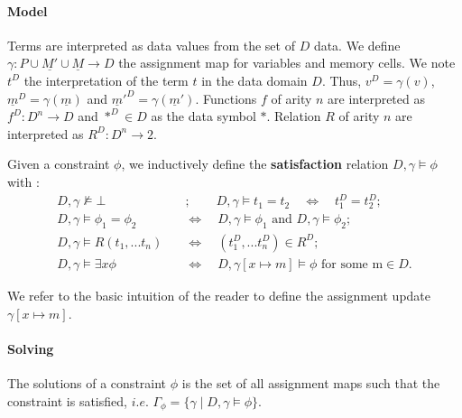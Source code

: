 \paragraph{Model} 
Terms are interpreted as data values from the set of $D$ data. We define $\gamma:P\cup \underline{M'} \cup \underline{M} \rightarrow D$ the assignment map for variables and memory cells. We note $t^D$ the interpretation of the term $t$ in the data domain $D$. Thus, $v^D=\gamma(v)$, $\underline{m}^D=\gamma(\underline{m})$ and $\underline{m}'^D=\gamma(\underline{m}')$. Functions $f$ of arity $n$ are interpreted as $f^{D}:D^n \rightarrow D$ and $*^D\in D$ as the data symbol $*$. Relation $R$ of arity $n$ are interpreted as $R^D : D^n \rightarrow 2$. \begin{definition}
	Given a constraint $\phi$, we inductively define the \textbf{satisfaction} relation $D, \gamma \models \phi$ with :
\begin{align*}
	 D, \gamma \not\models \bot   \quad &; \quad \quad D, \gamma \models t_1=t_2 \quad \Leftrightarrow \quad t_1^D=t_2^D; \\
	 D, \gamma \models \phi_1=\phi_2 \quad &\Leftrightarrow \quad D, \gamma \models \phi_1\text{ and }D, \gamma \models \phi_2 ; \\
	 D, \gamma \models R(t_1,...t_n) \quad &\Leftrightarrow \quad (t_1^D,...t_n^D) \in R^D; \\
	 D, \gamma \models \exists x\phi \quad &\Leftrightarrow \quad D, \gamma[x \mapsto m ] \models \phi \text{ for some m} \in D.
\end{align*}	
\end{definition}
We refer to the basic intuition of the reader to define the assignment update $\gamma[x \mapsto m]$.
\paragraph{Solving} 
The solutions of a constraint $\phi$ is the set of all assignment maps such that the constraint is satisfied, $i.e.$ $\Gamma_{\phi} = \{ \gamma \mid D,\gamma \models \phi \}$. 


